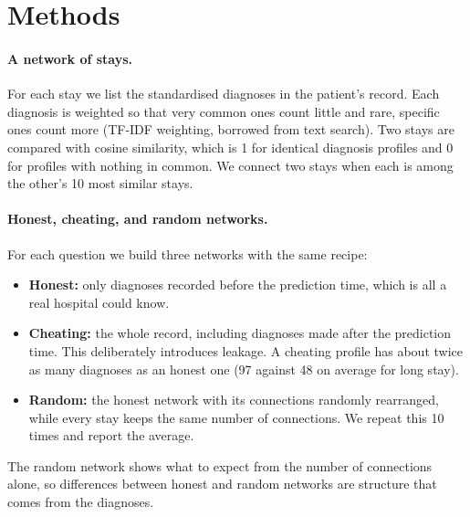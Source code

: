 \section{Methods}
\label{sec:methods}

\paragraph{A network of stays.} For each stay we list the standardised diagnoses in the patient's record. Each diagnosis is weighted so that very common ones count little and rare, specific ones count more (TF-IDF weighting, borrowed from text search). Two stays are compared with cosine similarity, which is 1 for identical diagnosis profiles and 0 for profiles with nothing in common. We connect two stays when each is among the other's 10 most similar stays.

\paragraph{Honest, cheating, and random networks.} For each question we build three networks with the same recipe:
\begin{itemize}
  \item \textbf{Honest:} only diagnoses recorded before the prediction time, which is all a real hospital could know.
  \item \textbf{Cheating:} the whole record, including diagnoses made after the prediction time. This deliberately introduces leakage. A cheating profile has about twice as many diagnoses as an honest one (97 against 48 on average for long stay).
  \item \textbf{Random:} the honest network with its connections randomly rearranged, while every stay keeps the same number of connections. We repeat this 10 times and report the average.
\end{itemize}
The random network shows what to expect from the number of connections alone, so differences between honest and random networks are structure that comes from the diagnoses.


